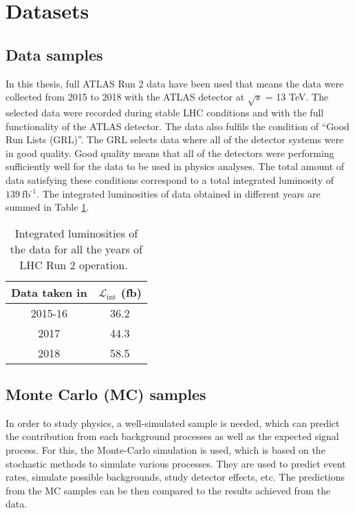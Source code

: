 \section{Datasets}%
\label{sec:analysisstrategy:datasets}

\subsection{Data samples}%
\label{sec:analysisstrategy:datasets:data}
In this thesis, full ATLAS Run 2 data have been used that means the data were collected from 2015 to 2018 with the ATLAS detector at $\sqrt{s}$ = 13 \si{\tera\electronvolt}. The selected data were recorded during stable LHC conditions and with the full functionality of the ATLAS detector. The data also fulfils the condition of \enquote{Good Run Lists (GRL)}. The GRL selects data where all of the detector systems were in good quality. Good quality means that all of the detectors were performing sufficiently well for the data to be used in physics analyses. The total amount of data satisfying these conditions correspond to a total integrated luminosity of $\SI{139}{\femto\barn^{\text{-1}}}$. The integrated luminosities of data obtained in different years are summed in Table \ref{table:analysisstrategy:datasets:data}.
\begin{table}[hbt!]
	\centering
	\begin{tabular}{c | c} 
		\toprule
		Data taken in & $\mathcal{L}_{\text{int}}$ (\si{\femto\barn^{\text{-1}}}) \\
		\midrule
		2015-16 & 36.2 \\
		2017 & 44.3 \\ 
		2018 & 58.5 \\ 
		\bottomrule
	\end{tabular}
	\caption{Integrated luminosities of the data for all the years of LHC Run 2 operation.~\cite{intnote:zboson}}
	\label{table:analysisstrategy:datasets:data}
\end{table}

\subsection{Monte Carlo (MC) samples}%
\label{sec:analysisstrategy:mc}
In order to study physics, a well-simulated sample is needed, which can predict the contribution from each background processes as well as the expected signal process. For this, the Monte-Carlo simulation is used, which is based on the stochastic methods to simulate various processes. They are used to predict event rates, simulate possible backgrounds, study detector effects, etc. The predictions from the MC samples can be then compared to the results achieved from the data.

